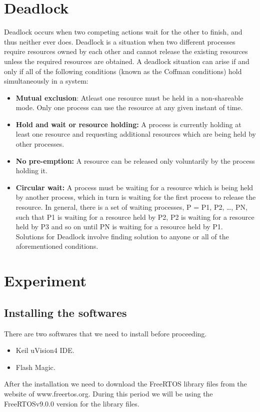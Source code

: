 \documentclass{article}
\begin{document}
\section{Deadlock}
Deadlock occurs when two competing actions wait for the other to finish, and thus neither ever does.
Deadlock is a situation when two different processes require resources owned by each other and cannot release the existing resources unless the required resources are obtained.
A deadlock situation can arise if and only if all of the following conditions (known as the Coffman conditions) hold simultaneously in a system:
\begin{itemize}
    


\item\textbf{Mutual exclusion}: Atleast one resource must be held in a non-shareable mode. Only one process can use the resource at any given instant of time.\\

\item \textbf{Hold and wait or resource holding:} A process is currently holding at least one resource and requesting additional resources which are being held by other processes.\\

\item \textbf{No pre-emption:} A resource can be released only voluntarily by the process holding it.\\

\item \textbf{Circular wait:} A process must be waiting for a resource which is being held by another process, which in turn is waiting for the first process to release the resource. In general, there is a set of waiting processes, P = {P1, P2, …, PN}, such that P1 is waiting for a resource held by P2, P2 is waiting for a resource held by P3 and so on until PN is waiting for a resource held by P1.\\
Solutions for Deadlock involve finding solution to anyone or all of the aforementioned conditions.

\end{itemize}


\section{Experiment}
\subsection{Installing the softwares}
There are two softwares that we need to install before proceeding.
\begin{itemize}
    \item Keil uVision4 IDE.
    \item Flash Magic.
\end{itemize}
After the installation we need to download the FreeRTOS library files from the website of www.freertos.org. During this period we will be using the FreeRTOSv9.0.0 version for the library files.
\end{document}
